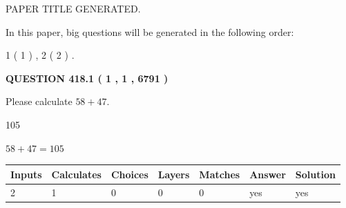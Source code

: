 \documentclass[12pt]{article}
\begin{document}
   
   
   
   
   
 \vspace{0.2in}
 
 
 
 
   
   
 PAPER TITLE GENERATED.
   
   
   
\vspace{0.2in}
   
In this paper, big questions will be generated in the following order: 
   
   
   1 ( 1 )
 ,
   2 ( 2 )
 .
  
\vspace{0.2in}
  
{\textbf{\Large{QUESTION
418.1 
 ( 1 , 1 , 6791 )
}}}
  
  
 
Please calculate $ %
58 +  %
47 $.
 
 
 
\noindent{}
 
 

105
 
 
\noindent{}
 
 

 
 
 
\noindent{}
 
 

$ %
58 +  %
47=   %
105$
 
 
\noindent{}
 
 

 
   
   
   
   
\noindent\begin{tabular}{|l|l|l|l|l|l|l|}
 \hline
Inputs & Calculates & Choices & Layers & Matches & Answer & Solution \\ \hline
 2  & 
 1  & 
 0
  & 
 0  & 
 0  & 
  yes & 
  yes 
  \\ \hline
 \end{tabular}
   
   
   
   
\noindent{}
   
\end{document}
